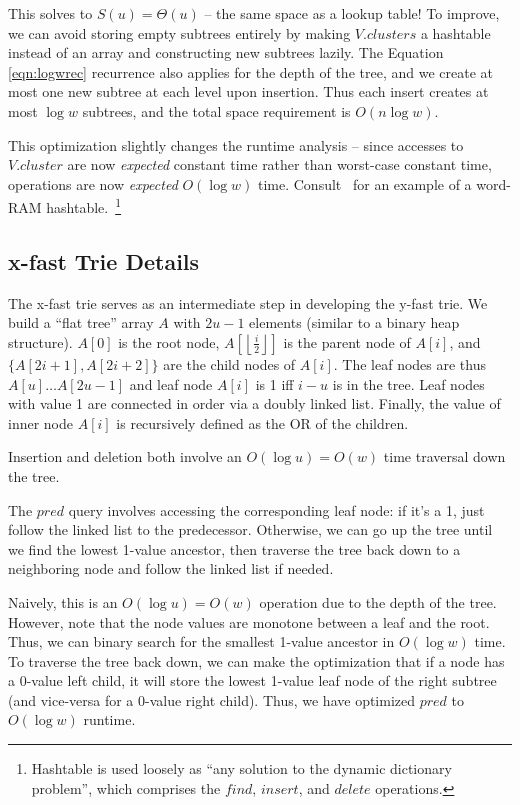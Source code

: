 \documentclass[11pt]{article}
\begin{document}
This solves to $S(u) = \Theta(u)$ -- the same space as a lookup table! To improve, we can avoid storing empty subtrees entirely by making $V.clusters$ a hashtable instead of an array and constructing new subtrees lazily. The Equation \eqref{eqn:logwrec} recurrence also applies for the depth of the tree, and we create at most one new subtree at each level upon insertion. Thus each insert creates at most $\log w$ subtrees, and the total space requirement is $O(n \log w)$. 

This optimization slightly changes the runtime analysis -- since accesses to $V.cluster$ are now \emph{expected} constant time rather than worst-case constant time, operations are now \emph{expected} $O(\log w)$ time. Consult~\cite{dietzfelbingerSICOMP94} for an example of a word-RAM hashtable.~\footnote{Hashtable is used loosely as ``any solution to the dynamic dictionary problem'', which comprises the $find$, $insert$, and $delete$ operations.}

\subsection{x-fast Trie Details}
The x-fast trie serves as an intermediate step in developing the y-fast trie. We build a ``flat tree'' array $A$ with $2 u - 1$ elements (similar to a binary heap structure). $A[0]$ is the root node, $A[\left \lfloor{\frac{i}{2}}\right \rfloor]$ is the parent node of $A[i]$, and $\{ A[2 i + 1], A[2 i + 2] \}$ are the child nodes of $A[i]$. The leaf nodes are thus $A[u] \dots A[2 u - 1]$ and leaf node $A[i]$ is 1 iff $i - u$ is in the tree. Leaf nodes with value 1 are connected in order via a doubly linked list. Finally, the value of inner node $A[i]$ is recursively defined as the OR of the children.

Insertion and deletion both involve an $O(\log u) = O(w)$ time traversal down the tree.

The $pred$ query involves accessing the corresponding leaf node: if it's a 1, just follow the linked list to the predecessor. Otherwise, we can go up the tree until we find the lowest 1-value ancestor, then traverse the tree back down to a neighboring node and follow the linked list if needed.

Naively, this is an $O(\log u) = O(w)$ operation due to the depth of the tree. However, note that the node values are monotone between a leaf and the root. Thus, we can binary search for the smallest 1-value ancestor in $O(\log w)$ time. To traverse the tree back down, we can make the optimization that if a node has a 0-value left child, it will store the lowest 1-value leaf node of the right subtree (and vice-versa for a 0-value right child). Thus, we have optimized $pred$ to $O(\log w)$ runtime.
\end{document}
